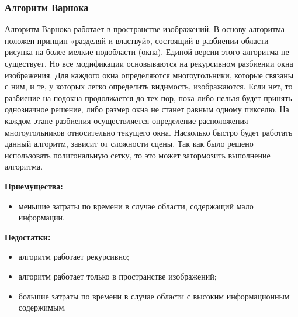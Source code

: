 

\subsubsection{Алгоритм Варнока}

Алгоритм Варнока работает в пространстве изображений.
В основу алгоритма положен принцип «разделяй и властвуй», состоящий в
разбиении области рисунка на более мелкие подобласти (окна).
Единой версии этого алгоритма не существует.
Но все модификации основываются на рекурсивном разбиении окна изображения.
Для каждого окна определяются многоугольники, которые связаны
с ним, и те, у которых легко определить видимость, изображаются.
Если нет, то разбиение на подокна продолжается до тех пор, пока либо нельзя будет принять однозначное решение, либо размер окна не станет равным одному пикселю.
На каждом этапе разбиения осуществляется определение расположения многоугольников относительно текущего окна.
Насколько быстро будет работать данный алгоритм, зависит от сложности сцены.
Так как было решено использовать полигональную сетку, то это может
затормозить выполнение алгоритма.

\textbf{Приемущества:}
\begin{itemize}
	\item меньшие затраты по времени в случае области, содержащий мало информации.
\end{itemize}

\textbf{Недостатки:}
\begin{itemize}
	\item алгоритм работает рекурсивно;
	\item алгоритм работает только в пространстве изображений;
	\item большие затраты по времени в случае области с высоким информационным содержимым.
\end{itemize}

